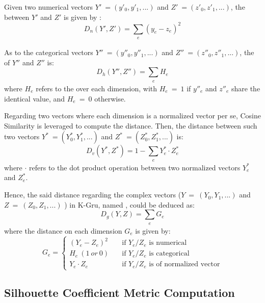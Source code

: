 Given two numerical vectors $Y'\ = (y'_0, y'_1, ...)$ and $Z'\ = (z'_0, z'_1, ...)$, the \od{}  between $Y'$ and $Z'$ is given by :
%
\begin{equation}
\label{eq:od}
D_n(Y', Z') = \sum_{\substack{e}} (y_e - z_e)^2
\end{equation}

As to the categorical vectors $Y''\ = (y''_0, y''_1, ...)$ and  $Z''\ = (z''_0, z''_1, ...)$, the \hd{}  of $Y''$ and $Z''$ is:
%
\begin{equation}
\label{eq:hd}
D_h(Y'', Z'') = \sum_{\substack{e}} H_e
\end{equation}
where $H_e$ refers to the \hd{} over each dimension, with $H_e\ =\ 1$ if $y''_e$ and $z''_e$ share the identical value, and $H_e\ =\ 0$ otherwise.

Regarding two vectors where each dimension is a normalized vector per se, Cosine Similarity  is leveraged to compute the distance.
Then, the distance between such two vectors $Y^{\ast}\ = (Y^{\ast}_0, Y^{\ast}_1, ...)$ and $Z^{\ast}\ = (Z^{\ast}_0, Z^{\ast}_1, ...)$ is:
%
\begin{equation}
\label{eq:vd}
D_v(Y^{\ast}, Z^{\ast}) = 1- \sum_{\substack{e}} Y^{\ast}_e \cdot Z^{\ast}_e
\end{equation}
where $\cdot$ refers to the dot product operation between two normalized vectors $Y^{\ast}_e$ and $Z^{\ast}_e$.

Hence, the said distance regarding the complex vectors ($Y\ =\ (Y_0, Y_1, ...)$ and $Z\ =\ (Z_0, Z_1, ...)$ ) in K-Gru, named \gd{}, could be deduced as:
%
\begin{equation}
\label{eq:gd}
D_g(Y, Z) = \sum_{\substack{e}} G_e
\end{equation}
where the distance on each dimension $G_e$ is given by:
%
\begin{equation}
\label{eq:ge}
G_e =
  \begin{cases}
    (Y_e - Z_e)^2       & \quad \text{if } Y_e/Z_e \text{ is numerical}\\
    H_e\ (1\ or\ 0)       	& \quad \text{if } Y_e/Z_e \text{ is categorical}\\
    Y_e \cdot Z_e  		& \quad \text{if } Y_e/Z_e \text{ is of normalized vector}
  \end{cases}
\end{equation}


\subsection{Silhouette Coefficient Metric Computation}
\label{sec:compu}

